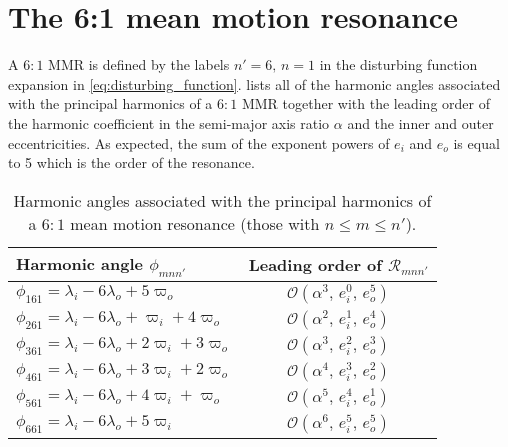 \section{The 6:1 mean motion resonance}
\label{sec:6_by_1_resonance}
A $6:1$ MMR is defined by the labels $n'=6,\,n=1$ in the disturbing
function expansion in \cref{eq:disturbing_function}. 
lists all of the harmonic angles associated with the principal
harmonics of a $6:1$ MMR together with the leading order of the
harmonic coefficient in the semi-major axis ratio $\alpha$ and
the inner and outer eccentricities. As expected, the sum of the
exponent powers of $e_i$ and $e_o$ is equal to 5 which is the order
of the resonance.
\begin{table}[h!]
\centering
\begin{tabular}{l c}
\toprule
    Harmonic angle $\phi_{mnn'}$ & Leading order of $\mathcal{R}_{mnn'}$\\
\midrule
    $\phi_{161}=\lambda_i-6\lambda_o+5\varpi_o$ & 
    $\mathcal{O}(\alpha^3,\,e_i^0,\,e_o^5)$\\
$\phi_{261}=\lambda_i-6\lambda_o+\varpi_i + 4\varpi_o$ & 
    $\mathcal{O}(\alpha^2,\,e_i^1,\,e_o^4)$\\
$\phi_{361}=\lambda_i-6\lambda_o+2\varpi_i + 3\varpi_o$ & 
    $\mathcal{O}(\alpha^3,\,e_i^2,\,e_o^3)$\\
$\phi_{461}=\lambda_i-6\lambda_o+3\varpi_i + 2\varpi_o$ & 
    $\mathcal{O}(\alpha^4,\,e_i^3,\,e_o^2)$\\
$\phi_{561}=\lambda_i-6\lambda_o+4\varpi_i + \varpi_o$ & 
    $\mathcal{O}(\alpha^5,\,e_i^4,\,e_o^1)$\\
$\phi_{661}=\lambda_i-6\lambda_o+5\varpi_i  $ & 
    $\mathcal{O}(\alpha^6,\,e_i^5,\,e_o^5)$\\
\bottomrule
\end{tabular}
\caption{Harmonic angles associated with the principal harmonics
    of a $6:1$ mean motion resonance (those with $n\leq m\leq n'$).}
\label{tab:6_1_angles}
\end{table}

